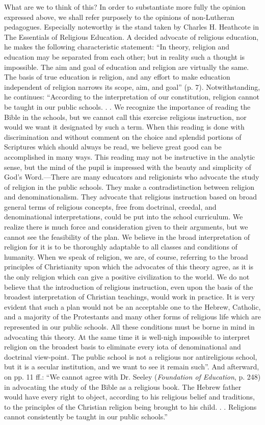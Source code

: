 What are we to think of this? In order to substantiate more fully the opinion expressed above, we shall refer purposely to the opinions of non-Lutheran pedagogues. Especially noteworthy is the stand taken by Charles H. Heathcote in The Essentials of Religious Education. A decided advocate of religious education, he makes the following characteristic statement: “In theory, religion and education may be separated from each other; but in reality such a thought is impossible. The aim and goal of education and religion are virtually the same. The basis of true education is religion, and any effort to make education independent of religion narrows its scope,
aim, and goal” (p. 7). Notwithstanding, he continues: “According to the interpretation of our constitution, religion cannot be taught in our public schools. . . We recognize the importance of reading the Bible in the schools, but we cannot call this exercise religious instruction, nor would we want it designated by such a term. When this reading is done with discrimination and without comment on the choice and splendid portions of Scriptures which should always be read, we believe great good can be accomplished in many ways. This reading may not be instructive in the analytic sense, but the mind of the pupil is impressed with the beauty and simplicity of God’s Word.—There are many educators and religionists who advocate the study of religion in the public schools. They make a contradistinction between religion and denominationalism. They advocate that religious instruction based on broad general terms of religious concepts, free from doctrinal, creedal, and denominational interpretations, could be put into the school curriculum. We realize there is much force and consideration given to their arguments, but we cannot see the feasibility of the plan. We believe in the broad interpretation of religion for it is to be thoroughly adaptable to all classes and conditions of humanity. When we speak of religion, we are, of course, referring to the broad principles of Christianity upon which the advocates of this theory agree, as it is the only religion which can give a positive civilization to the world. We do not believe that the introduction of religious instruction, even upon the basis of the broadest interpretation of Christian teachings, would work in practice. It is very evident that such a plan would not be an acceptable one to the Hebrew, Catholic, and a majority of the Protestants and many other forms of religious life which are represented in our public schools. All these conditions must be borne in mind in advocating this theory. At the same time it is well-nigh impossible to interpret religion on the broadest basis to eliminate every iota of denominational and doctrinal view-point. The public school is not a religious nor antireligious school, but it is a secular institution, and we want to see it remain such”. And afterward, on pp. 11 ff.: “We cannot agree with Dr. Seeley (\emph{Foundation of Education}, p. 248) in advocating the study of the Bible as a religious book. The Hebrew father would have every right to object, according to his religious belief and traditions, to the principles of the Christian religion being brought to his child. . . Religions cannot consistently be taught in our public schools.” 